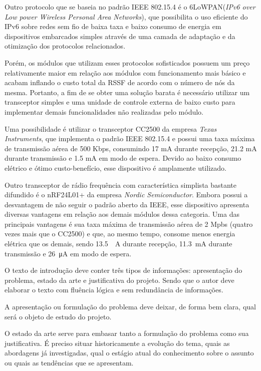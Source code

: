 \documentclass[
    12pt,               %
    a4paper,            %
    english,            %
    brazil,             %
    ]{article}
\begin{document}
Outro protocolo que se baseia no padrão IEEE 802.15.4 é o 6LoWPAN(\textit{IPv6 over Low power Wireless Personal Area Networks}),
que possibilita o uso eficiente do IPv6 sobre redes sem fio de baixa taxa e baixo consumo de energia em dispositivos embarcados
simples através de uma camada de adaptação e da otimização dos protocolos relacionados. \cite{shelby_bormann2009}

Porém, os módulos que utilizam esses protocolos sofisticados possuem um preço relativamente maior em relação aos módulos com
funcionamento mais básico e acabam inflando o custo total da RSSF de acordo com o número de nós da mesma. Portanto, a fim de se
obter uma solução barata é necessário utilizar um transceptor simples e uma unidade de controle externa de baixo custo para
implementar demais funcionalidades não realizadas pelo módulo.

Uma possibilidade é utilizar o transceptor CC2500 da empresa \textit{Texas Instruments}, que implementa o padrão IEEE 802.15.4 e
possui uma taxa máxima de transmissão aérea de 500 Kbps, consumindo 17 mA durante recepção, 21.2 mA durante transmissão e 1.5 mA
em modo de espera. Devido ao baixo consumo elétrico e ótimo custo-benefício, esse dispositivo é amplamente utilizado. \cite{ccdatasheet}

Outro transceptor de rádio frequência com característica simplista bastante difundido é o nRF24L01+ da empresa \textit{Nordic
Semiconductor}. Embora possui a desvantagem de não seguir o padrão aberto da IEEE, esse dispositivo apresenta diversas vantagens
em relação aos demais módulos dessa categoria. Uma das principais vantagens é sua taxa máxima de transmissão aérea de 2 Mpbs
(quatro vezes mais que o CC2500) e que, ao mesmo tempo, consome menos energia elétrica que os demais, sendo \SI{13.5}{\milli
\ampere} durante recepção, \SI{11.3}{\milli \ampere} durante transmissão e \SI{26}{\micro \ampere} em modo de espera.
\cite{nrfdatasheet}







O texto de introdução deve conter três tipos de informações: apresentação do problema, estado da arte e justificativa do projeto.
Sendo que o autor deve elaborar o texto com fluência lógica e sem redundância de informações.

A apresentação ou formulação do problema deve deixar, de forma bem clara, qual será o objeto de estudo do projeto.

O estado da arte serve para embasar tanto a formulação do problema como sua justificativa. É preciso situar historicamente a
evolução do tema, quais as abordagens já investigadas, qual o estágio atual do conhecimento sobre o assunto ou quais as tendências
que se apresentam.
\end{document}
